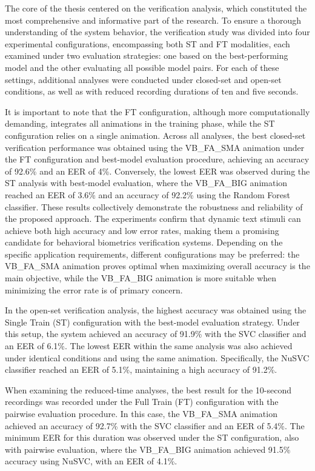 \documentclass[12pt]{report}
\begin{document}
The core of the thesis centered on the verification analysis, which constituted the most comprehensive and informative part of the research. 
To ensure a thorough understanding of the system behavior, the verification study was divided into four experimental configurations, encompassing both ST and FT modalities, each examined under two evaluation strategies: one based on the best-performing model and the other evaluating all possible model pairs. 
For each of these settings, additional analyses were conducted under closed-set and open-set conditions, as well as with reduced recording durations of ten and five seconds.

It is important to note that the FT configuration, although more computationally demanding, integrates all animations in the training phase, while the ST configuration relies on a single animation. 
Across all analyses, the best closed-set verification performance was obtained using the VB\_FA\_SMA animation under the FT configuration and best-model evaluation procedure, achieving an accuracy of 92.6\% and an EER of 4\%. 
Conversely, the lowest EER was observed during the ST analysis with best-model evaluation, where the VB\_FA\_BIG animation reached an EER of 3.6\% and an accuracy of 92.2\% using the Random Forest classifier.
These results collectively demonstrate the robustness and reliability of the proposed approach. 
The experiments confirm that dynamic text stimuli can achieve both high accuracy and low error rates, making them a promising candidate for behavioral biometrics verification systems. 
Depending on the specific application requirements, different configurations may be preferred: the VB\_FA\_SMA animation proves optimal when maximizing overall accuracy is the main objective, while the VB\_FA\_BIG animation is more suitable when minimizing the error rate is of primary concern.

In the open-set verification analysis, the highest accuracy was obtained using the Single Train (ST) configuration with the best-model evaluation strategy. 
Under this setup, the system achieved an accuracy of 91.9\% with the SVC classifier and an EER of 6.1\%. 
The lowest EER within the same analysis was also achieved under identical conditions and using the same animation. 
Specifically, the NuSVC classifier reached an EER of 5.1\%, maintaining a high accuracy of 91.2\%.

When examining the reduced-time analyses, the best result for the 10-second recordings was recorded under the Full Train (FT) configuration with the pairwise evaluation procedure. 
In this case, the VB\_FA\_SMA animation achieved an accuracy of 92.7\% with the SVC classifier and an EER of 5.4\%. 
The minimum EER for this duration was observed under the ST configuration, also with pairwise evaluation, where the VB\_FA\_BIG animation achieved 91.5\% accuracy using NuSVC, with an EER of 4.1\%.
\end{document}
